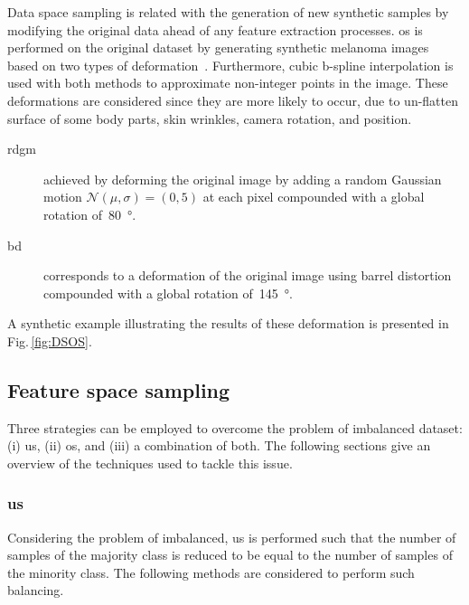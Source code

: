 Data space sampling is related with the generation of new synthetic samples by modifying the original data ahead of any feature extraction processes. 
\Ac{os} is performed on the original dataset by generating synthetic melanoma images based on two types of deformation~\cite{rastgoo2015ensemble}. Furthermore, cubic b-spline interpolation is used with both methods to approximate non-integer points in the image.
These deformations are considered since they are more likely to occur, due to un-flatten surface of some body parts, skin wrinkles, camera rotation, and position. 

 
\begin{description}
	\item[\Ac{rdgm}] achieved by deforming the original image by adding a random Gaussian motion $\mathcal{N}(\mu, \sigma) = (0,5)$ at each pixel compounded with a global rotation of~\SI{80}{\degree}.
	\item[\Ac{bd}] corresponds to a deformation of the original image using barrel distortion compounded with a global rotation of~\SI{145}{\degree}.
\end{description}
A synthetic example illustrating the results of these deformation is presented in Fig.\,\ref{fig:DSOS}.

\subsection{Feature space sampling}

Three strategies can be employed to overcome the problem of imbalanced dataset: (i) \ac{us}, (ii) \ac{os}, and (iii) a combination of both.
The following sections give an overview of the techniques used to tackle this issue.

\subsubsection{\acl{us}}

Considering the problem of imbalanced, \ac{us} is performed such that the number of samples of the majority class is reduced to be equal to the number of samples of the minority class.
The following methods are considered to perform such balancing.


